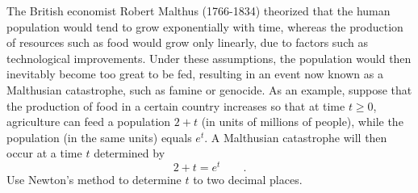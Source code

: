 The British economist Robert Malthus (1766-1834)
theorized that the human population would tend to grow
exponentially with time, whereas the production of resources
such as food would grow only linearly, due to factors such as technological improvements.
Under these assumptions, the
population would then inevitably become too great to be fed,
resulting in an event now known as a Malthusian catastrophe, such as famine or
genocide. As an example, suppose that the production of food
in a certain country increases so that at time $t\ge0$, agriculture
can feed a population $2+t$ (in units of millions of
people), while the population (in the same units) equals $e^t$.
A Malthusian catastrophe will then occur at a time $t$ determined by
\begin{equation*}
  2+t = e^t \qquad .
\end{equation*}
Use Newton's method to determine $t$ to two decimal places.
\answercheck
